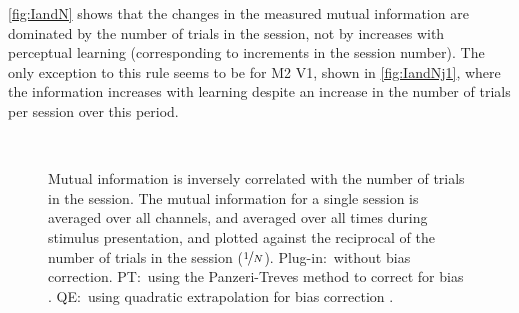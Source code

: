 \autoref{fig:IandN} shows that the changes in the measured mutual information are dominated by the number of trials in the session, not by increases with perceptual learning (corresponding to increments in the session number).
The only exception to this rule seems to be for \ac{M2} \ac{V1}, shown in \autoref{fig:IandNj1}, where the information increases with learning despite an increase in the number of trials per session over this period.

% 
% 
\begin{figure}[htbp]
    \\
    \caption{Mutual information is inversely correlated with the number of trials in the session. The mutual information for a single session is averaged over all channels, and averaged over all times during stimulus presentation, and plotted against the reciprocal of the number of trials in the session ($\nicefrac{1}{N}$). Plug-in:~without bias correction. \ac{PT}:~using the Panzeri-Treves method to correct for bias \citep{Panzeri1996}. \ac{QE}:~using quadratic extrapolation for bias correction \citep{Strong1998}.
}
    \label{fig:IvN}
\end{figure}

